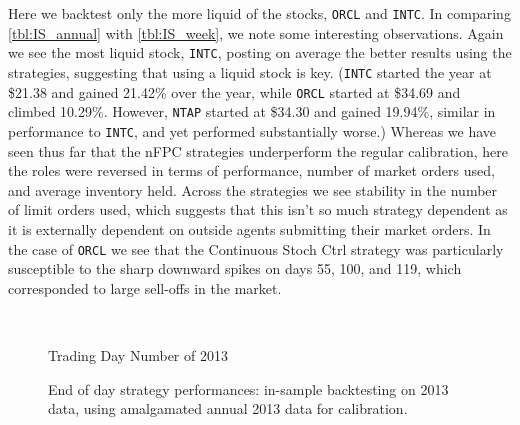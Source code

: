 Here we backtest only the more liquid of the stocks, \texttt{ORCL} and \texttt{INTC}. In comparing \autoref{tbl:IS_annual} with \autoref{tbl:IS_week}, we note some interesting observations. Again we see the most liquid stock, \texttt{INTC}, posting on average the better results using the strategies, suggesting that using a liquid stock is key.  (\texttt{INTC} started the year at \$21.38 and gained 21.42\% over the year, while \texttt{ORCL} started at \$34.69 and climbed 10.29\%. However, \texttt{NTAP} started at \$34.30 and gained 19.94\%, similar in performance to \texttt{INTC}, and yet performed substantially worse.) Whereas we have seen thus far that the nFPC strategies underperform the regular calibration, here the roles were reversed in terms of performance, number of market orders used, and average inventory held. Across the strategies we see stability in the number of limit orders used, which suggests that this isn't so much strategy dependent as it is externally dependent on outside agents submitting their market orders. In the case of \texttt{ORCL} we see that the Continuous Stoch Ctrl strategy was particularly susceptible to the sharp downward spikes on days 55, 100, and 119, which corresponded to large sell-offs in the market. 


\begin{figure}
\centering
\begin{subfigure}{.45\linewidth}
  \centering
  \setlength\figureheight{\linewidth} 
  \setlength\figurewidth{\linewidth}
  
\end{subfigure}%
\hfill%
\begin{subfigure}{.45\linewidth}
  \centering
  \setlength\figureheight{\linewidth} 
  \setlength\figurewidth{\linewidth}
   
\end{subfigure}\\

\leavevmode{}\hspace{0pt plus 1filll}\null

Trading Day Number of 2013

\vspace{1cm}
\begin{subfigure}{\linewidth}
  \setlength\figureheight{\linewidth} 
  \setlength\figurewidth{\linewidth}
  \resizebox{\linewidth}{!}{}
\end{subfigure}%
  \caption[In-sample backtesting performance using annual calibration]{End of day strategy performances: in-sample backtesting on 2013 data, using amalgamated annual 2013 data for calibration.}
  \label{fig:IS_annual_comp}
\end{figure}

